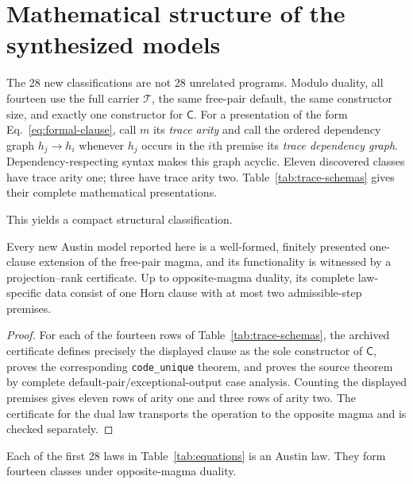 \documentclass[runningheads]{llncs}
\newcommand{\Tree}{\mathcal{T}}
\newcommand{\Code}{\mathsf{C}}
\begin{document}
\section{Mathematical structure of the synthesized models}
\label{sec:structure}

The 28 new classifications are not 28 unrelated programs.  Modulo duality,
all fourteen use the full carrier $\Tree$, the same free-pair default, the same
constructor size, and exactly one constructor for $\Code$.  For a presentation
of the form Eq.~\eqref{eq:formal-clause}, call $m$ its \emph{trace arity} and
call the ordered dependency graph
$h_j\to h_i$ whenever $h_j$ occurs in the $i$th premise its \emph{trace
dependency graph}.  Dependency-respecting syntax makes this graph acyclic.
Eleven discovered classes have trace arity one; three have trace arity two.
Table~\ref{tab:trace-schemas} gives their complete mathematical presentations.



This yields a compact structural classification.

\begin{proposition}
Every new Austin model reported here is a well-formed, finitely presented
one-clause extension of the free-pair magma, and its functionality is witnessed
by a projection--rank certificate.  Up to opposite-magma duality, its complete
law-specific data consist of one Horn clause with at most two admissible-step
premises.
\end{proposition}

\begin{proof}
For each of the fourteen rows of Table~\ref{tab:trace-schemas}, the archived
certificate defines precisely the displayed clause as the sole constructor of
$\Code$, proves the corresponding \texttt{code\_unique} theorem, and proves
the source theorem by complete default-pair/exceptional-output case analysis.
Counting the displayed premises
gives eleven rows of arity one and three rows of arity two.  The certificate for
the dual law transports the operation to the opposite magma and is checked
separately.
\end{proof}

\begin{theorem}
\label{thm:austin-classifications}
Each of the first 28 laws in Table~\ref{tab:equations} is an Austin law.  They
form fourteen classes under opposite-magma duality.
\end{theorem}
\end{document}
